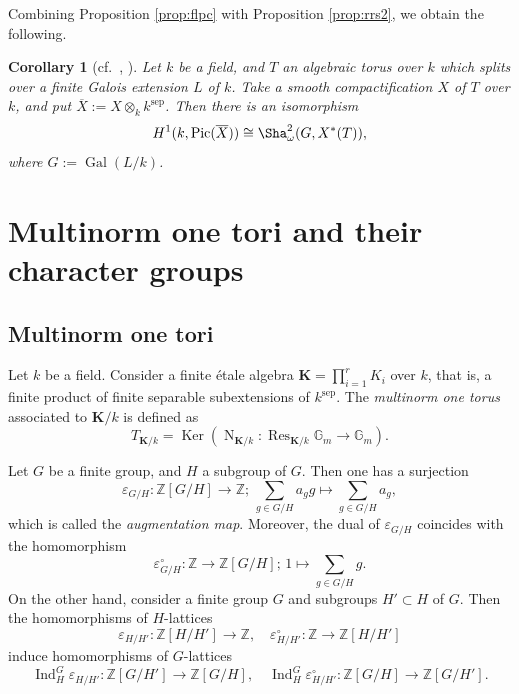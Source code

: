 \documentclass[12pt]{amsart}
\theoremstyle{plain}
\newtheorem{cor}[thm]{Corollary}
\theoremstyle{definition}
\numberwithin{thm}{section}
\numberwithin{equation}{section}
\newcommand{\Z}{\mathbb{Z}}
\newcommand{\G}{\mathbb{G}}
\newcommand{\bK}{\mathbf{K}}
\DeclareMathOperator{\Ker}{Ker}
\DeclareMathOperator{\Gal}{Gal}
\DeclareMathOperator{\N}{N}
\DeclareMathOperator{\Res}{Res}
\DeclareMathOperator{\Pic}{Pic}
\DeclareMathOperator{\sep}{sep}
\DeclareMathOperator{\Ind}{Ind}
\begin{document}
Combining Proposition \ref{prop:flpc} with Proposition \ref{prop:rrs2}, we obtain the following. 

\begin{cor}[{cf.~\cite[Proposition 9.5 (ii)]{ColliotThelene1987}, \cite[Proposition 9.8]{Sansuc1981}}]\label{cor:crvs}
Let $k$ be a field, and $T$ an algebraic torus over $k$ which splits over a finite Galois extension $L$ of $k$. Take a smooth compactification $X$ of $T$ over $k$, and put $\overline{X}:=X\otimes_{k}k^{\sep}$. Then there is an isomorphism
\begin{equation*}
    H^{1}(k,\Pic(\overline{X}))\cong \Sha_{\omega}^{2}(G,X^{*}(T)),
\end{equation*}
where $G:=\Gal(L/k)$. 
\end{cor}

\section{Multinorm one tori and their character groups}\label{sect:mult}

\subsection{Multinorm one tori}\label{ssec:mnot}

Let $k$ be a field. Consider a finite {\'e}tale algebra $\bK=\prod_{i=1}^{r}K_{i}$ over $k$, that is, a finite product of finite separable subextensions of $k^{\sep}$. The \emph{multinorm one torus} associated to $\bK/k$ is defined as
\begin{equation*}
    T_{\bK/k}=\Ker(\N_{\bK/k}\colon \Res_{\bK/k}\G_{m}\rightarrow \G_{m}). 
\end{equation*}

Let $G$ be a finite group, and $H$ a subgroup of $G$. Then one has a surjection
\begin{equation*}
    \varepsilon_{G/H}\colon \Z[G/H]\rightarrow \Z;\,\sum_{g \in G/H} a_g g\mapsto \sum_{g \in G/H} a_g, 
\end{equation*}
which is called the \emph{augmentation map}. Moreover, the dual of $\varepsilon_{G/H}$ coincides with the homomorphism
\begin{equation*}
    \varepsilon_{G/H}^{\circ}\colon \Z\rightarrow \Z[G/H];\,1\mapsto \sum_{g\in G/H}g. 
\end{equation*}
On the other hand, consider a finite group $G$ and subgroups $H'\subset H$ of $G$. Then the homomorphisms of $H$-lattices
\begin{equation*}
   \varepsilon_{H/H'}\colon \Z[H/H']\rightarrow \Z,\quad \varepsilon_{H/H'}^{\circ}\colon \Z \rightarrow \Z[H/H']
\end{equation*}
induce homomorphisms of $G$-lattices
\begin{equation*}
   \Ind_{H}^{G}\varepsilon_{H/H'}\colon \Z[G/H']\rightarrow \Z[G/H],\quad \Ind_{H}^{G}\varepsilon_{H/H'}^{\circ}\colon \Z[G/H] \rightarrow \Z[G/H']. 
\end{equation*}
\end{document}
